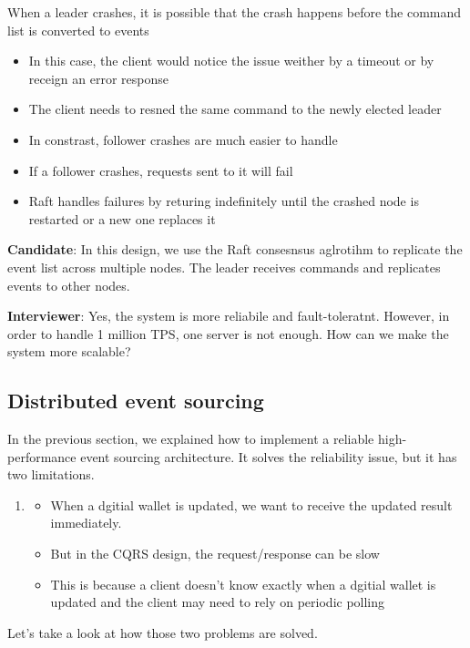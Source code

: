 \documentclass{report}
\theoremstyle{definition}
\let\oldsubsection\subsection
\renewcommand{\subsection}{\oldsubsection*}
\begin{document}
When a leader crashes, it is possible that the crash happens before the command list is converted to events
\begin{itemize}
\item
In this case, the client would notice the issue weither by a timeout or by receign an error response
\item
The client needs to resned the same command to the newly elected leader
\item
In constrast, follower crashes are much easier to handle
\item
If a follower crashes, requests sent to it will fail
\item
Raft handles failures by returing indefinitely until the crashed node is restarted or a new one replaces it
\end{itemize}

\textbf{Candidate}: In this design, we use the Raft consesnsus aglrotihm to replicate the event list across multiple nodes. The leader receives commands and replicates events to other nodes.

\textbf{Interviewer}: Yes, the system is more reliabile and fault-toleratnt. However, in order to handle 1 million TPS, one server is not enough. How can we make the system more scalable?

\subsection{Distributed event sourcing}

In the previous section, we explained how to implement a reliable high-performance event sourcing architecture. It solves the reliability issue, but it has two limitations.

\begin{enumerate}
\item

\begin{itemize}
\item
When a dgitial wallet is updated, we want to receive the updated result immediately.
\item
But in the CQRS design, the request/response can be slow
\item
This is because a client doesn't know exactly when a dgitial wallet is updated and the client may need to rely  on periodic polling
\end{itemize}
\end{enumerate}

Let's take a look at how those two problems are solved.
\end{document}

